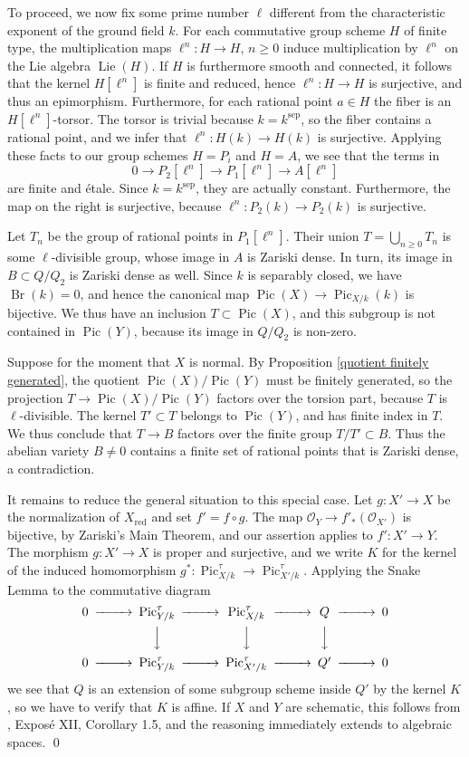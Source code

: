 \documentclass[oneside, 12pt]{amsart}
\theoremstyle{definition}
\theoremstyle{remark}
\newcommand{\Br}{\operatorname{Br}}
\newcommand{\Lie}{\operatorname{Lie}}
\newcommand{\lra}{\longrightarrow}
\renewcommand{\O}{\mathscr{O}}
\newcommand{\Pic}{\operatorname{Pic}}
\newcommand{\ra}{\rightarrow}
\newcommand{\red}{{\operatorname{red}}}
\newcommand{\sep}{{\operatorname{sep}}}
\begin{document}
To proceed, we now fix some prime number $\ell$ different from the characteristic exponent of the ground field $k$.
For each commutative group scheme  $H$ of finite type,  the multiplication maps $\ell^n:H\ra H$, $n\geq 0$
induce  multiplication by $\ell^n$ on the Lie algebra $\Lie(H)$. If  $H$ is  furthermore smooth and connected, it  follows that the kernel $H[\ell^n]$ is finite and reduced,
hence $\ell^n:H\ra H$ is surjective, and thus an epimorphism. Furthermore, for each rational point $a\in H$ the fiber is an $H[\ell^n]$-torsor.
The torsor is trivial because $k=k^\sep$, so the fiber contains a rational point,
and we infer that $\ell^n:H(k)\ra H(k)$ is surjective.
Applying these facts to our group schemes $H=P_i$ and $H=A$, we see that the terms in 
$$
0\lra P_2[\ell^n]\lra P_1[\ell^n]\lra A[\ell^n]
$$
are finite and \'etale. Since $k=k^\sep$, they are actually constant. Furthermore, the map on the right is   surjective,
because $\ell^n:P_2(k)\ra P_2(k)$ is surjective.

Let $T_n$ be the group of rational points in $P_1[\ell^n]$. Their union $T=\bigcup_{n\geq 0} T_n$ 
is some $\ell$-divisible  group, whose image in $A$ is Zariski dense.
In turn, its image in $B\subset Q/Q_2$ is Zariski dense as well.
 Since $k$ is separably closed, we have $\Br(k)=0$,
and hence the canonical map $\Pic(X)\ra \Pic_{X/k}(k)$ is bijective.
We thus have an inclusion $T\subset \Pic(X)$, and this subgroup is not contained in $\Pic(Y)$,
because its image in $Q/Q_2$ is non-zero.

Suppose for the moment that $X$ is normal. By  Proposition \ref{quotient finitely generated}, the quotient $\Pic(X)/\Pic(Y)$ must be finitely generated, 
so the projection $T\ra \Pic(X)/\Pic(Y)$ factors over the torsion part, because $T$ is $\ell$-divisible.
The kernel $T'\subset T$ belongs to $\Pic(Y)$, and has finite index in $T$.
We thus conclude that $T\ra B$ factors over the finite group $T/T'\subset B$.
Thus the abelian variety $B\neq 0$ contains a finite set of rational points that is Zariski dense, a contradiction.

It remains to reduce the general situation to this special case. Let $g:X'\ra X$ be the normalization of $X_\red$
and set $f'=f\circ g$. The map $\O_Y\ra f'_*(\O_{X'})$ is bijective, by Zariski's Main Theorem, and our assertion applies
to $f':X'\ra Y$. The morphism $g:X'\ra X$ is proper and surjective, and we write $K$ for the kernel of
the induced homomorphism $g^*:\Pic^\tau_{X/k}\ra \Pic^\tau_{X'/k}$.
Applying the Snake Lemma to the commutative diagram
$$
\begin{CD}
0	@>>>	\Pic^\tau_{Y/k}	@>>>	\Pic^\tau_{X/k}	@>>> 	Q	@>>> 0\\
@.		@VVV			@VVV			@VVV\\
0	@>>>	\Pic^\tau_{Y/k}	@>>>	\Pic^\tau_{X'/k}	@>>> 	Q'	@>>> 0\\
\end{CD}
$$
we see that $Q$ is an extension of some subgroup scheme inside $Q'$ by the kernel  $K$, so we   have to verify that $K$ is affine.
If $X$ and $Y$ are schematic, this   follows from \cite{SGA 6}, Expos\'e XII, Corollary 1.5, and the
reasoning immediately extends to algebraic spaces.  
\qed
\end{document}
